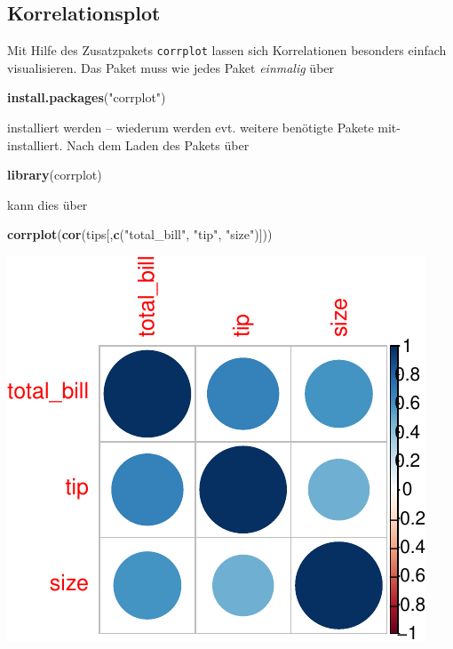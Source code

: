 \documentclass[12pt,ngerman,paper=a4,pagesize,DIV=13]{scrreprt}
\newenvironment{Shaded}{\begin{snugshade}}{\end{snugshade}}
\newcommand{\KeywordTok}[1]{\textcolor[rgb]{0.13,0.29,0.53}{\textbf{#1}}}
\newcommand{\NormalTok}[1]{#1}
\newcommand{\StringTok}[1]{\textcolor[rgb]{0.31,0.60,0.02}{#1}}
\begin{document}
\hypertarget{korrelationsplot}{%
\subsection{Korrelationsplot}\label{korrelationsplot}}

Mit Hilfe des Zusatzpakets \texttt{corrplot} lassen sich Korrelationen
besonders einfach visualisieren. Das Paket muss wie jedes Paket
\emph{einmalig} über

\begin{Shaded}
\begin{Highlighting}[]
\KeywordTok{install.packages}\NormalTok{(}\StringTok{"corrplot"}\NormalTok{)}
\end{Highlighting}
\end{Shaded}

installiert werden -- wiederum werden evt. weitere benötigte Pakete
mit-installiert. Nach dem Laden des Pakets über

\begin{Shaded}
\begin{Highlighting}[]
\KeywordTok{library}\NormalTok{(corrplot)}
\end{Highlighting}
\end{Shaded}

kann dies über

\begin{Shaded}
\begin{Highlighting}[]
\KeywordTok{corrplot}\NormalTok{(}\KeywordTok{cor}\NormalTok{(tips[,}\KeywordTok{c}\NormalTok{(}\StringTok{"total_bill"}\NormalTok{, }\StringTok{"tip"}\NormalTok{, }\StringTok{"size"}\NormalTok{)]))}
\end{Highlighting}
\end{Shaded}

\includegraphics{DatenerhebungStatistik-Uebung_files/figure-latex/unnamed-chunk-55-1.pdf}
\end{document}
